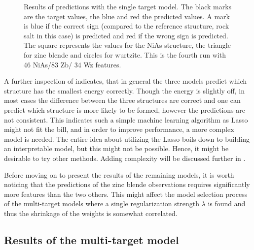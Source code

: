 \begin{figure}[ht!]
    \caption[Prediction results of the 4th iteration using the single-target model]{Results of predictions with the single target model. The black marks are the target values, the blue and red the predicted values. A mark is blue if the correct sign (compared to the reference structure, rock salt in this case) is predicted and red if the wrong sign is predicted. The square represents the values for the NiAs structure, the triangle for zinc blende and circles for wurtzite. This is the fourth run with 46 NiAs/83 Zb/ 34 Wz features.}
    \label{fig:single_stor_fourth}
\end{figure}

A further inspection of  indicates, that in general the three models predict which structure has the smallest energy correctly. Though the energy is slightly off, in most cases the difference between the three structures are correct and one can predict which structure is more likely to be formed, however the predictions are not consistent. This indicates such a simple machine learning algorithm as Lasso might not fit the bill, and in order to improve performance, a more complex model is needed. The entire idea about utilizing the Lasso boils down to building an interpretable model, but this might not be possible. Hence, it might be desirable to try other methods. Adding complexity will be discussed further in .

Before moving on to present the results of the remaining models, it is worth noticing that the predictions of the zinc blende observations requires significantly more features than the two others. This might affect the model selection process of the multi-target models where a single regularization strength $\lambda$ is found and thus the shrinkage of the weights is somewhat correlated.


\subsection{Results of the multi-target model}\label{sec:multi_results}

